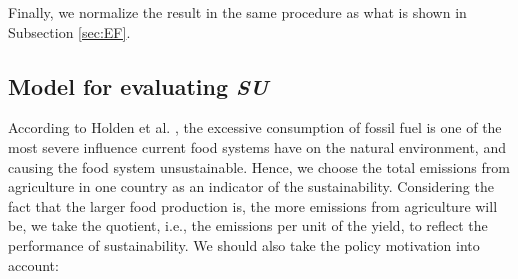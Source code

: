 \documentclass[12pt]{article}
\begin{document}
Finally, we normalize the result in the same procedure as what is shown in Subsection \ref{sec:EF}.


\subsection{Model for evaluating \textit{SU}}

According to Holden et al. \cite{cite:Sus1}, the excessive consumption of fossil fuel is one of the most severe influence current food systems have on the natural environment, and causing the food system unsustainable. Hence, we choose the total emissions from agriculture in one country as an indicator of the sustainability. Considering the fact that the larger food production is, the more emissions from agriculture will be, we take the quotient, i.e., the emissions per unit of the yield, to reflect the performance of sustainability. We should also take the policy motivation into account:
\end{document}
